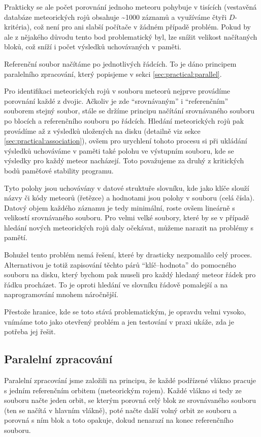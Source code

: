 Prakticky se ale počet porovnání jednoho meteoru pohybuje v tisících (vestavěná databáze meteorických rojů obsahuje \textasciitilde1000 záznamů a využíváme čtyři $D$-kritéria), což není pro ani slabší počítače v žádném případě problém. Pokud by ale z nějakého důvodu tento bod problematický byl, lze snížit velikost načítaných bloků, což sníží i počet výsledků uchovávaných v paměti.

\medskip

Referenční soubor načítáme po jednotlivých řádcích. To je dáno principem paralelního zpracování, který popisjeme v sekci \ref{sec:practical:parallel}.

\medskip

Pro identifikaci meteorických rojů v souboru meteorů nejprve provádíme porovnání každé z dvojic. Ačkoliv je zde "`srovnávaným"' i "`referenčním"' souborem stejný soubor, stále se držíme principu načítání srovnávaného souboru po blocích a referenčního souboru po řádcích. Hledání meteorických rojů pak provádíme až z výsledků uložených na disku (detailně viz sekce \ref{sec:practical:association}), ovšem pro urychlení tohoto procesu si při ukládání výsledků uchováváme v paměti také polohu ve výstupním souboru, kde se výsledky pro každý meteor nacházejí. Toto považujeme za druhý z kritických bodů paměťové stability programu.

\smallskip

Tyto polohy jsou uchovávány v datové struktuře slovníku, kde jako klíče slouží názvy či kódy meteorů (řetězce) a hodnotami jsou polohy v souboru (celá čísla). Datový objem každého záznamu je tedy minimální, roste ovšem lineárně s velikostí srovnávaného souboru. Pro velmi velké soubory, které by se v případě hledání nových meteorických rojů daly očekávat, můžeme narazit na problémy s pamětí.

Bohužel tento problém nemá řešení, které by drasticky nezpomalilo celý proces. Alternativou je totiž zapisování těchto párů "`klíč--hodnota"' do pomocného souboru na disku, který bychom pak museli pro každý hledaný meteor řádek pro řádku procházet. To je oproti hledání ve slovníku řádově pomalejší a na naprogramování mnohem náročnější.

Přestože hranice, kde se toto stává problematickým, je opravdu velmi vysoko, vnímáme toto jako otevřený problém a jen testování v praxi ukáže, zda je potřeba jej řešit.

\subsection{Paralelní zpracování\label{sec:practical:parallel}}%
Paralelní zpracování jsme založili na principu, že každé podřízené vlákno pracuje s jedním referenčním orbitem (meteorickým rojem). Každé vlákno si tedy ze souboru načte jeden orbit, se kterým porovná celý blok ze srovnávaného souboru (ten se načítá v hlavním vlákně), poté načte další volný orbit ze souboru a porovná s ním blok a toto opakuje, dokud nenarazí na konec referenčního souboru.

